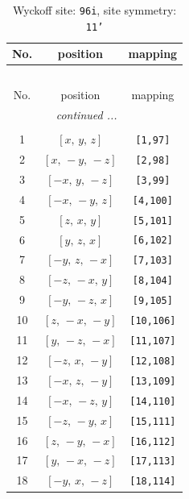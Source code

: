 \documentclass[fleqn,8pt]{jsarticle}
\begin{document}
\begin{longtable}{ccc}
\caption{Wyckoff site: {\tt 96i}, site symmetry: {\tt 11'}}
 \\
 \hline \hline
No. & position & mapping \\ \hline \endfirsthead

\multicolumn{2}{l}{\tablename\ \thetable{}} \\
 \hline \hline
No. & position & mapping \\ \hline \endhead

 \hline \hline
\multicolumn{2}{r}{\footnotesize\it continued ...} \\ \endfoot

 \hline \hline
\multicolumn{2}{r}{} \\ \endlastfoot

1 & $\left[ x,\, y,\, z \right]$ & {\tt [1,97]} \\ \hline
2 & $\left[ x,\, - y,\, - z \right]$ & {\tt [2,98]} \\ \hline
3 & $\left[ - x,\, y,\, - z \right]$ & {\tt [3,99]} \\ \hline
4 & $\left[ - x,\, - y,\, z \right]$ & {\tt [4,100]} \\ \hline
5 & $\left[ z,\, x,\, y \right]$ & {\tt [5,101]} \\ \hline
6 & $\left[ y,\, z,\, x \right]$ & {\tt [6,102]} \\ \hline
7 & $\left[ - y,\, z,\, - x \right]$ & {\tt [7,103]} \\ \hline
8 & $\left[ - z,\, - x,\, y \right]$ & {\tt [8,104]} \\ \hline
9 & $\left[ - y,\, - z,\, x \right]$ & {\tt [9,105]} \\ \hline
10 & $\left[ z,\, - x,\, - y \right]$ & {\tt [10,106]} \\ \hline
11 & $\left[ y,\, - z,\, - x \right]$ & {\tt [11,107]} \\ \hline
12 & $\left[ - z,\, x,\, - y \right]$ & {\tt [12,108]} \\ \hline
13 & $\left[ - x,\, z,\, - y \right]$ & {\tt [13,109]} \\ \hline
14 & $\left[ - x,\, - z,\, y \right]$ & {\tt [14,110]} \\ \hline
15 & $\left[ - z,\, - y,\, x \right]$ & {\tt [15,111]} \\ \hline
16 & $\left[ z,\, - y,\, - x \right]$ & {\tt [16,112]} \\ \hline
17 & $\left[ y,\, - x,\, - z \right]$ & {\tt [17,113]} \\ \hline
18 & $\left[ - y,\, x,\, - z \right]$ & {\tt [18,114]} \\ \hline

\end{longtable}
\end{document}
